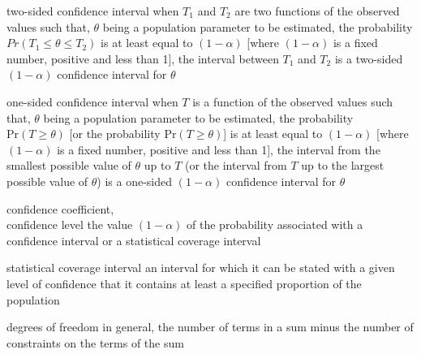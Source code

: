 \documentclass[avery5371,grid]{flashcards}
\begin{document}
\begin{flashcard}[Definition]{two-sided confidence interval}
\vspace{\fill}
    when $T_1$ and $T_2$ are two functions of the observed values such that,
        $\theta$ being a population parameter to be estimated,
        the probability $Pr( T_1 \leq \theta \leq T_2 )$ is at least equal to $(1-\alpha )$
        [where $(1-\alpha)$ is a fixed number, positive and less than 1],
        the interval between $T_1$ and $T_2$ is a two-sided $(1-\alpha)$ confidence interval for $\theta$
\vspace{\fill}
\end{flashcard}

\begin{flashcard}[Definition]{one-sided confidence interval}
\vspace{\fill}
    when $T$ is a function of the observed values such that,
        $\theta$ being a population parameter to be estimated,
        the probability $\mathrm{Pr}( T\geq\theta )$ [or the probability $\mathrm{Pr}( T\geq\theta )$] is at least equal to $(1-\alpha)$
        [where $(1-\alpha)$ is a fixed number, positive and less than 1],
        the interval from the smallest possible value of $\theta$ up to $T$
        (or the interval from $T$ up to the largest possible value of $\theta$)
        is a one-sided $(1-\alpha)$ confidence interval for $\theta$
\vspace{\fill}
\end{flashcard}

\begin{flashcard}[Definition]{confidence coefficient, \\ confidence level}
\vspace{\fill}
    the value $(1-\alpha)$ of the probability associated with a confidence interval or a statistical coverage interval
\vspace{\fill}
\end{flashcard}

\begin{flashcard}[Definition]{statistical coverage interval}
\vspace{\fill}
    an interval for which it can be stated with a given level of confidence that it contains at least a specified proportion of the population
\vspace{\fill}
\end{flashcard}

\begin{flashcard}[Definition]{degrees of freedom}
\vspace{\fill}
    in general, the number of terms in a sum minus the number of constraints on the terms of the sum
\vspace{\fill}
\end{flashcard}
\end{document}
